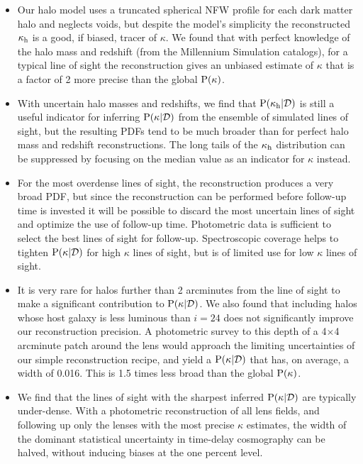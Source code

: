 \documentclass[useAMS,usenatbib]{mn2e}
\begin{document}
\begin{itemize} 

\item Our halo model uses a truncated spherical NFW profile for each dark
matter halo and neglects voids, but despite the model's simplicity the
reconstructed $\kappa_{\rm h}$ is a good, if biased, tracer of $\kappa$.  We found
that with perfect knowledge of the halo mass and redshift (from the Millennium
Simulation catalogs), for a typical line of sight the reconstruction gives an
unbiased estimate of $\kappa$ that is a factor of 2 more precise than the
global ${\rm P}(\kappa)$.

\item With uncertain halo masses and redshifts, we find that
${\rm P}(\kappa_{\rm h}|{\mathcal{D}})$ is still a useful indicator for inferring
${\rm P}(\kappa|{\mathcal{D}})$ from the ensemble of simulated lines of sight, but the
resulting PDFs tend to be much broader than for perfect halo mass and redshift
reconstructions. The long tails of the $\kappa_{\rm h}$ distribution can be
suppressed by focusing on the median value as an indicator for $\kappa$
instead.

\item  For the most overdense lines of sight, the reconstruction produces a
very broad PDF, but since the reconstruction can be performed before follow-up
time is invested it will be possible to discard the most uncertain lines of
sight and optimize the use of follow-up time. Photometric data is sufficient 
to select the best lines of sight for follow-up. Spectroscopic coverage helps
to tighten  ${\rm P}(\kappa|{\mathcal{D}})$ for high $\kappa$ lines of sight, but is of
limited use for  low $\kappa$ lines of sight.

\item It is very rare for halos further than 2 arcminutes from the line of
sight to make a significant contribution to ${\rm P}(\kappa|{\mathcal{D}})$. We also found
that including halos whose host galaxy is less luminous than $i=24$ does not
significantly improve our reconstruction precision. A photometric survey to
this depth of a 4$\times$4 arcminute patch around the lens would approach the
limiting uncertainties of our simple reconstruction recipe, and yield a 
${\rm P}(\kappa|{\mathcal{D}})$ that has, on average, a width of 0.016. This is 1.5 times
less broad than the global ${\rm P}(\kappa)$.

\item We find that the lines of sight with the sharpest inferred
${\rm P}(\kappa|{\mathcal{D}})$ are typically under-dense. With a photometric
reconstruction of all lens fields, and following up only the lenses with the
most precise $\kappa$ estimates, the width of the dominant statistical
uncertainty in time-delay cosmography can be halved, without inducing biases
at the one percent level.

\end{itemize}
\end{document}

